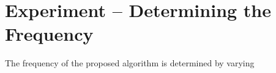 
\section{Experiment -- Determining the Frequency}

The frequency of the proposed algorithm is determined by varying 
